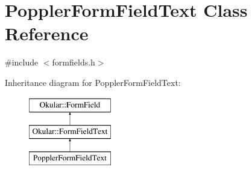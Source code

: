 \hypertarget{classPopplerFormFieldText}{\section{Poppler\+Form\+Field\+Text Class Reference}
\label{classPopplerFormFieldText}
}


{\ttfamily \#include $<$formfields.\+h$>$}

Inheritance diagram for Poppler\+Form\+Field\+Text\+:\begin{figure}[H]
\begin{center}
\leavevmode
\includegraphics[height=3.000000cm]{classPopplerFormFieldText}
\end{center}
\end{figure}
